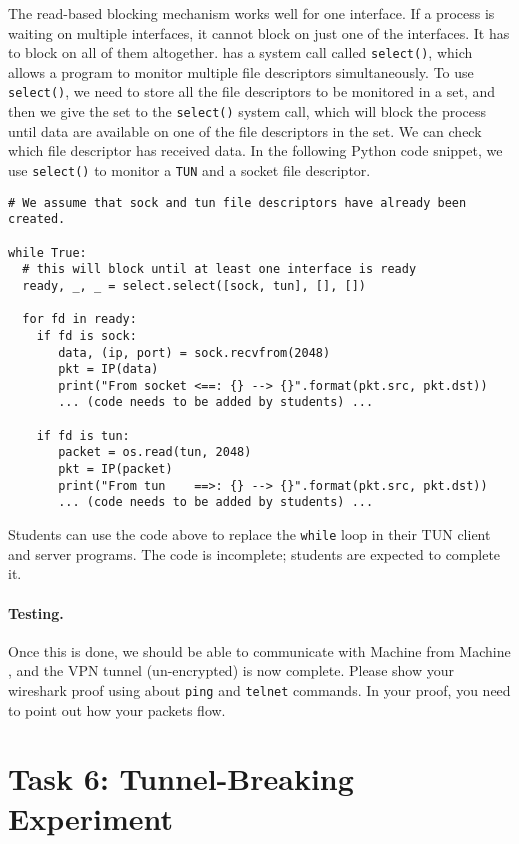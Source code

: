 The read-based blocking mechanism works well for one interface. If a process is waiting on
multiple interfaces, it cannot block on just one of the interfaces. It has to block on all of
them altogether.  \linux has a system call called \texttt{select()}, which
allows a program to monitor multiple file descriptors simultaneously.
To use \texttt{select()}, we need to store all the file descriptors to be monitored in a set,
and then we give the set to the \texttt{select()} system
call, which will block the process until data are available on one of the
file descriptors in the set. We can check which
file descriptor has received data. In the following Python code snippet,
we use \texttt{select()} to monitor a \texttt{TUN} and a socket file
descriptor.


\begin{lstlisting}
# We assume that sock and tun file descriptors have already been created.

while True:
  # this will block until at least one interface is ready
  ready, _, _ = select.select([sock, tun], [], [])

  for fd in ready:
    if fd is sock:
       data, (ip, port) = sock.recvfrom(2048)
       pkt = IP(data)
       print("From socket <==: {} --> {}".format(pkt.src, pkt.dst))
       ... (code needs to be added by students) ...

    if fd is tun:
       packet = os.read(tun, 2048)
       pkt = IP(packet)
       print("From tun    ==>: {} --> {}".format(pkt.src, pkt.dst))
       ... (code needs to be added by students) ...
\end{lstlisting}
 
Students can use the code above to replace the \texttt{while} loop
in their TUN client and server programs. The code is incomplete; students
are expected to complete it. 


\paragraph{Testing.} 
Once this is done, we should be able to communicate with Machine \hostv
from Machine \hostu, and the VPN tunnel (un-encrypted) is now complete. 
Please show your wireshark proof using about \texttt{ping} and
\texttt{telnet} commands. In your proof, you need to point out how your 
packets flow.



\section{Task 6:  Tunnel-Breaking Experiment}


